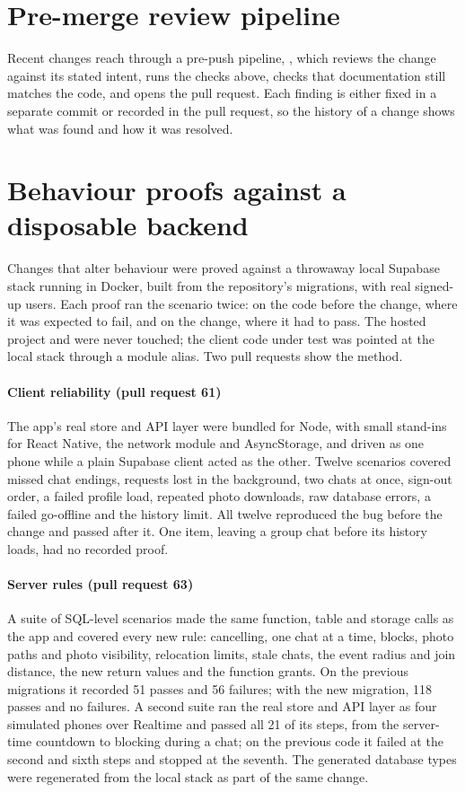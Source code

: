 \section{Pre-merge review pipeline}

Recent changes reach  through a pre-push pipeline, , which reviews the change
against its stated intent, runs the checks above, checks that documentation still matches the code, and
opens the pull request. Each finding is either fixed in a separate commit or recorded in the pull request,
so the history of a change shows what was found and how it was resolved.

\section{Behaviour proofs against a disposable backend}

Changes that alter behaviour were proved against a throwaway local Supabase stack running in Docker, built
from the repository's migrations, with real signed-up users. Each proof ran the scenario twice: on the code
before the change, where it was expected to fail, and on the change, where it had to pass. The hosted
project and  were never touched; the client code under test was pointed at
the local stack through a module alias. Two pull requests show the method.

\paragraph{Client reliability (pull request 61)} The app's real store and API layer were bundled for
Node, with small stand-ins for React Native, the network module and AsyncStorage, and driven as one phone
while a plain Supabase client acted as the other. Twelve scenarios covered missed chat endings, requests
lost in the background, two chats at once, sign-out order, a failed profile load, repeated photo
downloads, raw database errors, a failed go-offline and the history limit. All twelve reproduced the bug
before the change and passed after it. One item, leaving a group chat before its history loads, had no
recorded proof.

\paragraph{Server rules (pull request 63)} A suite of SQL-level scenarios made the same function, table
and storage calls as the app and covered every new rule: cancelling, one chat at a time, blocks, photo
paths and photo visibility, relocation limits, stale chats, the event radius and join distance, the new
return values and the function grants. On the previous migrations it recorded 51 passes and 56 failures;
with the new migration, 118 passes and no failures. A second suite ran the real store and API layer as
four simulated phones over Realtime and passed all 21 of its steps, from the server-time countdown to
blocking during a chat; on the previous code it failed at the second and sixth steps and stopped at the seventh. The
generated database types were regenerated from the local stack as part of the same change.

